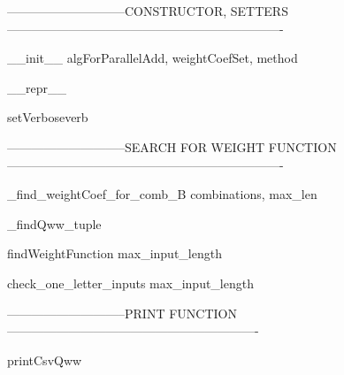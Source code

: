 -----------------------------CONSTRUCTOR, SETTERS-------------------------------------------------------------------

\begin{method}{\_\_init\_\_}{ algForParallelAdd, weightCoefSet, method}

\end{method}


\begin{method}{\_\_repr\_\_}{}

\end{method}


\begin{method}{setVerbose}{verb}

\end{method}


-----------------------------SEARCH FOR WEIGHT FUNCTION-------------------------------------------------------------------

\begin{method}{\_find\_weightCoef\_for\_comb\_B}{ combinations, max\_len}

\end{method}


\begin{method}{\_findQw}{w\_tuple}

\end{method}


\begin{method}{findWeightFunction}{ max\_input\_length}

\end{method}


\begin{method}{check\_one\_letter\_inputs}{ max\_input\_length}

\end{method}


-----------------------------PRINT FUNCTION-------------------------------------------------------------

\begin{method}{printCsvQww}{}

\end{method}